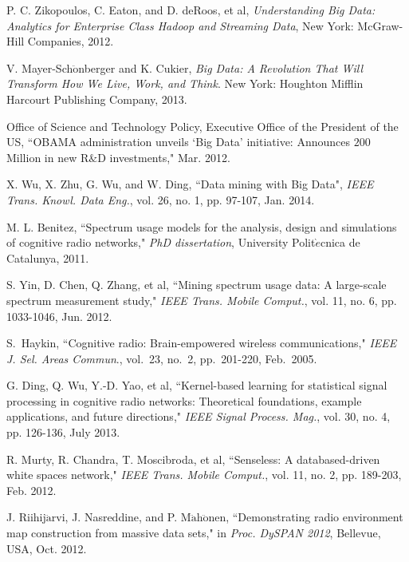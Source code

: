 \documentclass[12pt,draftcls,journal,letterpaper,oneside,onecolumn]{IEEEtran}
\begin{document}
\begin{thebibliography}{99}

P. C. Zikopoulos, C. Eaton, and D. deRoos, et al, \emph{Understanding Big Data: Analytics for Enterprise Class Hadoop and Streaming Data}, New York: McGraw-Hill Companies, 2012.

V. Mayer-Sch$\ddot{\textrm{o}}$nberger and K. Cukier, \emph{Big Data: A Revolution That Will Transform How We Live, Work, and Think}. New York: Houghton Mifflin Harcourt Publishing Company, 2013.

Office of Science and Technology Policy, Executive Office of the President of the US, ``OBAMA administration unveils `Big Data' initiative: Announces $200$ Million in new R$\&$D investments," Mar. 2012.


X. Wu, X. Zhu, G. Wu, and W. Ding, ``Data mining with Big Data", \emph{IEEE Trans. Knowl. Data Eng.}, vol. 26, no. 1, pp. 97-107, Jan. 2014.



M. L. Benitez, ``Spectrum usage models for the analysis, design and simulations of cognitive radio networks," \emph{PhD dissertation}, University Polit$\grave{e}$cnica de Catalunya, 2011.

S. Yin, D. Chen, Q. Zhang, et al, ``Mining spectrum usage data: A large-scale spectrum measurement study," \emph{IEEE Trans. Mobile Comput.}, vol. 11, no. 6, pp. 1033-1046, Jun. 2012.

S.~Haykin, ``Cognitive radio: Brain-empowered wireless communications," \emph{IEEE J. Sel. Areas Commun}., vol.~23, no.~2, pp.~201-220, Feb.~2005.

G. Ding, Q. Wu, Y.-D. Yao, et al, ``Kernel-based learning for statistical signal processing in cognitive radio networks: Theoretical foundations, example applications, and future directions," \emph{IEEE Signal Process. Mag.}, vol. 30, no. 4, pp. 126-136, July 2013.


R. Murty, R. Chandra, T. Moscibroda, et al, ``Senseless: A databased-driven white spaces network," \emph{IEEE Trans. Mobile Comput.}, vol. 11, no. 2, pp. 189-203, Feb. 2012.

J. Riihij$\ddot{\textrm{a}}$rvi, J. Nasreddine, and P. M$\ddot{\textrm{a}}$h$\ddot{\textrm{o}}$nen, ``Demonstrating radio environment map construction from massive data sets," in \emph{Proc. DySPAN 2012}, Bellevue, USA, Oct. 2012.


\end{thebibliography}
\end{document}
